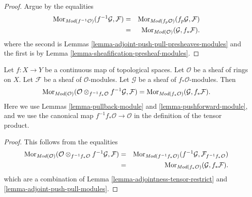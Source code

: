 \begin{proof}
Argue by the equalities
\begin{eqnarray*}
\mathop{\mathrm{Mor}}\nolimits_{\textit{Mod}(f^{-1}\mathcal{O})}(f^{-1}\mathcal{G}, \mathcal{F})
& = &
\mathop{\mathrm{Mor}}\nolimits_{\textit{Mod}(f_p\mathcal{O})}(f_p\mathcal{G}, \mathcal{F}) \\
& = &
\mathop{\mathrm{Mor}}\nolimits_{\textit{Mod}(\mathcal{O})}(\mathcal{G}, f_*\mathcal{F}).
\end{eqnarray*}
where the second is
Lemmas \ref{lemma-adjoint-push-pull-presheaves-modules}
and the first is by Lemma \ref{lemma-sheafification-presheaf-modules}.
\end{proof}

\begin{lemma}
\label{lemma-adjoint-pull-push-modules}
Let $f : X \to Y$ be a continuous map of topological spaces.
Let $\mathcal{O}$ be a sheaf of rings on $X$.
Let $\mathcal{F}$ be a sheaf of $\mathcal{O}$-modules.
Let $\mathcal{G}$ be a sheaf of $f_*\mathcal{O}$-modules.
Then
$$
\mathop{\mathrm{Mor}}\nolimits_{\textit{Mod}(\mathcal{O})}(
\mathcal{O} \otimes_{f^{-1}f_*\mathcal{O}} f^{-1}\mathcal{G}, \mathcal{F})
=
\mathop{\mathrm{Mor}}\nolimits_{\textit{Mod}(f_*\mathcal{O})}(\mathcal{G}, f_*\mathcal{F}).
$$
Here we use
Lemmas \ref{lemma-pullback-module}
and \ref{lemma-pushforward-module}, and we use
the canonical map $f^{-1}f_*\mathcal{O} \to \mathcal{O}$
in the definition of the tensor product.
\end{lemma}

\begin{proof}
This follows from the equalities
\begin{eqnarray*}
\mathop{\mathrm{Mor}}\nolimits_{\textit{Mod}(\mathcal{O})}(
\mathcal{O} \otimes_{f^{-1}f_*\mathcal{O}} f^{-1}\mathcal{G}, \mathcal{F})
& = &
\mathop{\mathrm{Mor}}\nolimits_{\textit{Mod}(f^{-1}f_*\mathcal{O})}(
f^{-1}\mathcal{G}, \mathcal{F}_{f^{-1}f_*\mathcal{O}}) \\
& = &
\mathop{\mathrm{Mor}}\nolimits_{\textit{Mod}(f_*\mathcal{O})}(\mathcal{G}, f_*\mathcal{F}).
\end{eqnarray*}
which are a combination of
Lemma \ref{lemma-adjointness-tensor-restrict}
and \ref{lemma-adjoint-push-pull-modules}.
\end{proof}


